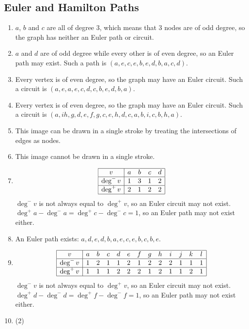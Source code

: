 \documentclass[12pt, A4]{article}
\newcommand{\enumset}[1]{\setcounter{enumi}{#1}}
\begin{document}
		\subsection{Euler and Hamilton Paths}
			\begin{enumerate}
				\item
					\(a\), \(b\) and \(c\) are all of degree 3, which means that 3 nodes are of odd degree, so the graph has neither an Euler path or circuit.
				\enumset{2}
				\item
					\(a\) and \(d\) are of odd degree while every other is of even degree, so an Euler path may exist. Such a path is \((a, e, c, e, b, e, d, b, a, c, d)\).
				\enumset{4}
				\item
					Every vertex is of even degree, so the graph may have an Euler circuit. Such a circuit is \((a, e, a, e, c, d, c, b, e, d, b, a)\).
				\enumset{6}
				\item
					Every vertex is of even degree, so the graph may have an Euler circuit. Such a circuit is \((a, i h, g, d, e, f, g, c, e, h, d, c, a, b, i, c, b, h, a)\).
				\enumset{12}
				\item
					This image can be drawn in a single stroke by treating the intersections of edges as nodes. \\
				\enumset{14}
				\item
					This image cannot be drawn in a single stroke. \\
				\enumset{18}
				\item
					\[\begin{array}{|c|*{4}{c}|}\hline
						v & a & b & c & d \\\hline
						\deg^-v & 1 & 3 & 1 & 2 \\\hline
						\deg^+v & 2 & 1 & 2 & 2 \\\hline
					\end{array}\]
					\(\deg^-v\) is not always equal to \(\deg^+v\), so an Euler circuit may not exist. \(\deg^+a - \deg^-a = \deg^+c - \deg^-c = 1\), so an Euler path may not exist either. \\
				\enumset{20}
				\item
					An Euler path exists: \(a, d, e, d, b, a, e, c, e, b, c, b, e\).
				\enumset{22}
				\item
					\[\begin{array}{|c|*{12}{c}|}\hline
						v & a & b & c & d & e & f & g & h & i & j & k & l \\\hline
						\deg^-v & 1 & 2 & 1 & 1 & 2 & 1 & 2 & 2 & 2 & 1 & 1 & 1 \\\hline
						\deg^+v & 1 & 1 & 1 & 2 & 2 & 2 & 1 & 2 & 1 & 1 & 2 & 1 \\\hline
					\end{array}\]
					\(\deg^-v\) is not always equal to \(\deg^+v\), so an Euler circuit may not exist. \(\deg^+d - \deg^-d = \deg^+f - \deg^-f = 1\), so an Euler path may not exist either. \\
				\enumset{25}
				\item
					\begin{tasks}(2)
						\task	
					\end{tasks}

			\end{enumerate}
\end{document}
